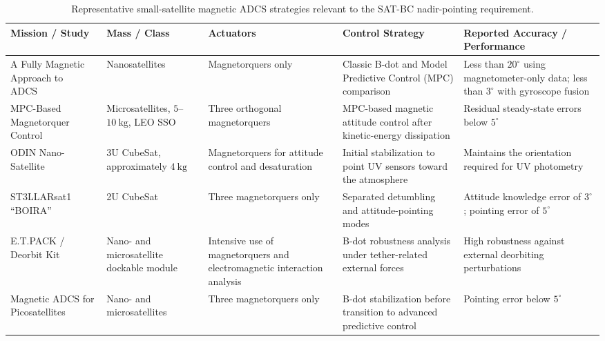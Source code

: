 \begin{table}[htbp]
\centering
\caption{Representative small-satellite magnetic ADCS strategies relevant to the SAT-BC nadir-pointing requirement.}
\label{tab:adcs_satbc_magnetic_adcs_comparison}
\renewcommand{\arraystretch}{1.25}
\footnotesize
\begin{tabular}{p{3.0cm} p{2.2cm} p{2.4cm} p{3.2cm} p{3.0cm}}
\toprule
\textbf{Mission / Study} & \textbf{Mass / Class} & \textbf{Actuators} & \textbf{Control Strategy} & \textbf{Reported Accuracy / Performance} \\
\midrule
A Fully Magnetic Approach to ADCS~\cite{bono2024fully} &
Nanosatellites &
Magnetorquers only &
Classic B-dot and Model Predictive Control (MPC) comparison &
Less than \(20^\circ\) using magnetometer-only data; less than \(3^\circ\) with gyroscope fusion \\

MPC-Based Magnetorquer Control~\cite{esit2022model} &
Microsatellites, \(5\)--\(10~\mathrm{kg}\), LEO SSO &
Three orthogonal magnetorquers &
MPC-based magnetic attitude control after kinetic-energy dissipation &
Residual steady-state errors below \(5^\circ\) \\

ODIN Nano-Satellite~\cite{odin_project} &
3U CubeSat, approximately \(4~\mathrm{kg}\) &
Magnetorquers for attitude control and desaturation &
Initial stabilization to point UV sensors toward the atmosphere &
Maintains the orientation required for UV photometry \\

ST3LLARsat1 ``BOIRA''~\cite{marcos2023st3llarsat1} &
2U CubeSat &
Three magnetorquers only &
Separated detumbling and attitude-pointing modes &
Attitude knowledge error of \(3^\circ\); pointing error of \(5^\circ\) \\

E.T.PACK / Deorbit Kit~\cite{garciagonzalez2023avionic} &
Nano- and microsatellite dockable module &
Intensive use of magnetorquers and electromagnetic interaction analysis &
B-dot robustness analysis under tether-related external forces &
High robustness against external deorbiting perturbations \\

Magnetic ADCS for Picosatellites~\cite{giesselmann2024development} &
Nano- and microsatellites &
Three magnetorquers only &
B-dot stabilization before transition to advanced predictive control &
Pointing error below \(5^\circ\) \\
\bottomrule
\end{tabular}
\end{table}

